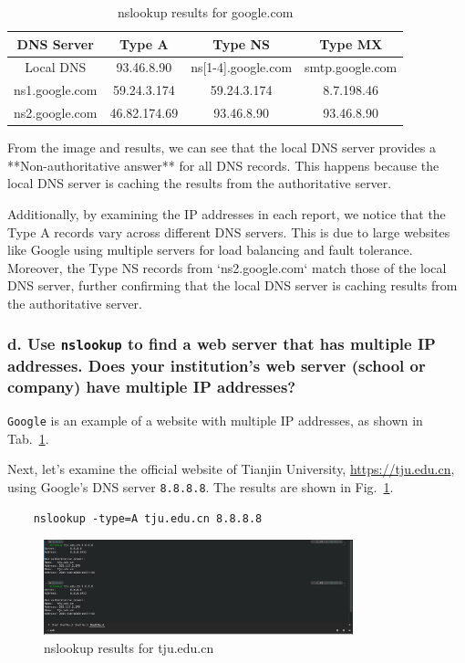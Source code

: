 \documentclass{cshwk}
\begin{document}
\begin{table}[htbp]
    \centering
    \begin{tabular}{cccc}
        \hline
        DNS Server     & Type A       & Type NS            & Type MX         \\
        \hline
        Local DNS      & 93.46.8.90   & ns[1-4].google.com & smtp.google.com \\
        ns1.google.com & 59.24.3.174  & 59.24.3.174        & 8.7.198.46      \\
        ns2.google.com & 46.82.174.69 & 93.46.8.90         & 93.46.8.90      \\
        \hline
    \end{tabular}
    \caption{nslookup results for google.com}
    \label{tab:nslookup}
\end{table}

From the image and results, we can see that the local DNS server provides a **Non-authoritative answer** for all DNS records. This happens because the local DNS server is caching the results from the authoritative server.

Additionally, by examining the IP addresses in each report, we notice that the Type A records vary across different DNS servers. This is due to large websites like Google using multiple servers for load balancing and fault tolerance. Moreover, the Type NS records from `ns2.google.com` match those of the local DNS server, further confirming that the local DNS server is caching results from the authoritative server.

\subsubsection*{d. Use \texttt{nslookup} to find a web server that has multiple IP addresses. Does your institution's web server (school or company) have multiple IP addresses?}

\texttt{Google} is an example of a website with multiple IP addresses, as shown in Tab.~\ref{tab:nslookup}.

Next, let’s examine the official website of Tianjin University, \href{tju.edu.cn}{https://tju.edu.cn}, using Google's DNS server \texttt{8.8.8.8}. The results are shown in Fig.~\ref{fig:nslookup-tju}.


\begin{verbatim}
    nslookup -type=A tju.edu.cn 8.8.8.8
\end{verbatim}

\begin{figure}[htbp]
    \centering
    \includegraphics[width=0.8\textwidth]{hw2-1-6.png}
    \caption{nslookup results for tju.edu.cn}
    \label{fig:nslookup-tju}
\end{figure}
\end{document}
